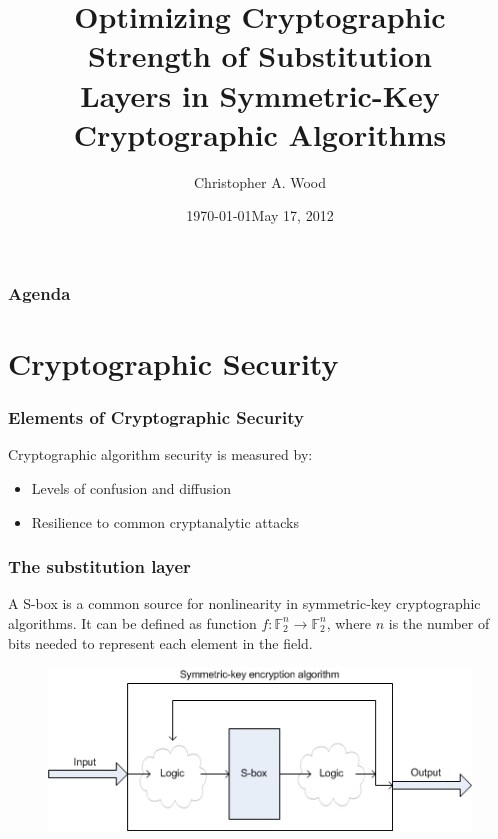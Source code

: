 \documentclass[handout]{beamer}
\title[Optimizing Cryptographic Algorithm Strength]{Optimizing Cryptographic Strength of Substitution\\ Layers in Symmetric-Key Cryptographic Algorithms}
\institute[RIT]{}
\date{\today}
\author{Christopher A. Wood}
\date{May 17, 2012}
\newcommand{\field}[1]{\mathbb{#1}} %
\begin{document}

\begin{frame}
	\titlepage
\end{frame}

\begin{frame}
	\frametitle{Agenda}
	\tableofcontents
\end{frame}

\section{Cryptographic Security}
\begin{frame}
	\frametitle{Elements of Cryptographic Security}
	Cryptographic algorithm security is measured by:
	\begin{itemize}
		\item Levels of confusion and diffusion
		\item Resilience to common cryptanalytic attacks
	\end{itemize}
\end{frame}

\begin{frame}
	\frametitle{The substitution layer}
	A S-box is a common source for nonlinearity in symmetric-key cryptographic algorithms. It can be defined as function $f : \field{F}_2^n \to \field{F}_2^n$, where $n$ is the number of bits needed to represent each element in the field.

\begin{figure}
\centering
\includegraphics[scale = 0.6]{images/sub_layer.jpg}
\end{figure}

\end{frame}
\end{document}
